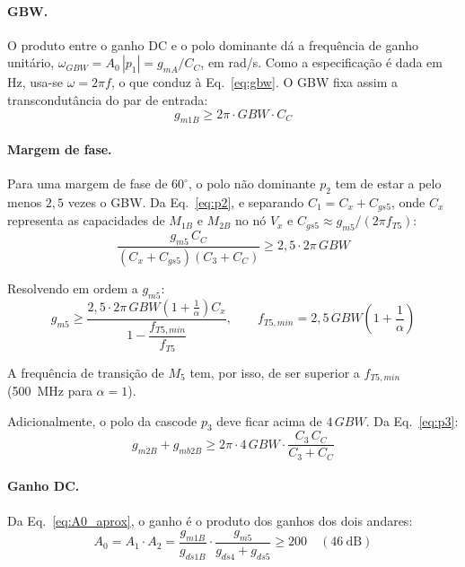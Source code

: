 \paragraph{GBW.} O produto entre o ganho DC e o polo dominante dá a frequência de ganho unitário,
$\omega_{GBW} = A_0\,|p_1| = g_{mA}/C_C$, em rad/s. Como a especificação é dada em Hz, usa-se
$\omega = 2\pi f$, o que conduz à Eq.~\eqref{eq:gbw}. O GBW fixa assim a transcondutância do par de entrada:
\begin{equation}
    g_{m1B} \ge 2\pi \cdot GBW \cdot C_C
    \label{eq:cond_gm1b}
\end{equation}

\paragraph{Margem de fase.} Para uma margem de fase de $60^\circ$, o polo não dominante $p_2$ tem
de estar a pelo menos $2{,}5$ vezes o GBW. Da Eq.~\eqref{eq:p2}, e separando $C_1 = C_x + C_{gs5}$,
onde $C_x$ representa as capacidades de $M_{1B}$ e $M_{2B}$ no nó $V_x$ e $C_{gs5} \approx g_{m5}/(2\pi f_{T5})$:
\begin{equation}
    \frac{g_{m5}\,C_C}{\left(C_x + C_{gs5}\right)\left(C_3 + C_C\right)} \ge 2{,}5 \cdot 2\pi\,GBW
\end{equation}

Resolvendo em ordem a $g_{m5}$:
\begin{equation}
    g_{m5} \ge \frac{2{,}5 \cdot 2\pi\,GBW \left(1 + \frac{1}{\alpha}\right) C_x}{1 - \dfrac{f_{T5,min}}{f_{T5}}},
    \qquad f_{T5,min} = 2{,}5\,GBW\left(1 + \frac{1}{\alpha}\right)
    \label{eq:cond_gm5}
\end{equation}

A frequência de transição de $M_5$ tem, por isso, de ser superior a $f_{T5,min}$ (500~MHz para $\alpha = 1$).

Adicionalmente, o polo da cascode $p_3$ deve ficar acima de $4\,GBW$. Da Eq.~\eqref{eq:p3}:
\begin{equation}
    g_{m2B} + g_{mb2B} \ge 2\pi \cdot 4\,GBW \cdot \frac{C_3\,C_C}{C_3 + C_C}
    \label{eq:cond_gm2b}
\end{equation}

\paragraph{Ganho DC.} Da Eq.~\eqref{eq:A0_aprox}, o ganho é o produto dos ganhos dos dois andares:
\begin{equation}
    A_0 = A_1 \cdot A_2 = \frac{g_{m1B}}{g_{ds1B}}\cdot\frac{g_{m5}}{g_{ds4} + g_{ds5}} \ge 200 \quad (46~\text{dB})
\end{equation}

